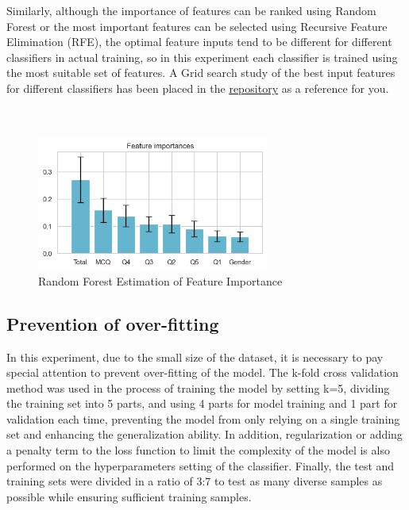 \documentclass[journal]{IEEEtai}
\begin{document}
Similarly, although the importance of features can be ranked using Random Forest or the most important features can be selected using Recursive Feature Elimination (RFE), the optimal feature inputs tend to be different for different classifiers in actual training, so in this experiment each classifier is trained using the most suitable set of features. A Grid search study of the best input features for different classifiers has been placed in the \href{https://github.com/MushihimePepsi/XJTLU_ICS_Y2S2_Course-notes_23-24/tree/main/INT104-%E4%BA%BA%E5%B7%A5%E6%99%BA%E8%83%BD}{\ul{repository}} as a reference for you.
\\\\\\
\begin{figure}[htbp]
	\centerline{\includegraphics[width=18pc]{Feature importances.png}}
	\caption{Random Forest Estimation of Feature Importance}
\end{figure}

\subsection{\textbf{Prevention of over-fitting}}
In this experiment, due to the small size of the dataset, it is necessary to pay special attention to prevent over-fitting of the model. The k-fold cross validation method was used in the process of training the model by setting k=5, dividing the training set into 5 parts, and using 4 parts for model training and 1 part for validation each time, preventing the model from only relying on a single training set and enhancing the generalization ability. In addition, regularization or adding a penalty term to the loss function to limit the complexity of the model is also performed on the hyperparameters setting of the classifier. Finally, the test and training sets were divided in a ratio of 3:7 to test as many diverse samples as possible while ensuring sufficient training samples.
\end{document}
